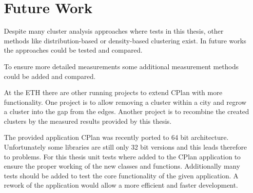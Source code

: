 \chapter{Future Work}
\label{sec:future_work}

Despite many cluster analysis approaches where tests in this thesis, other methods like distribution-based or density-based clustering exist. In future works the approaches could be tested and compared.

To ensure more detailed measurements some additional measurement methods could be added and compared.

At the ETH there are other running projects to extend CPlan with more functionality. One project is to allow removing a cluster within a city and regrow a cluster into the gap from the edges. Another project is to recombine the created clusters by the measured results provided by this thesis.

The provided application CPlan was recently ported to 64 bit architecture. Unfortunately some libraries are still only 32 bit versions and this leads therefore to problems. For this thesis unit tests where added to the CPlan application to ensure the proper working of the new classes and functions. Additionally many tests should be added to test the core functionality of the given application. A rework of the application would allow a more efficient and faster development.

